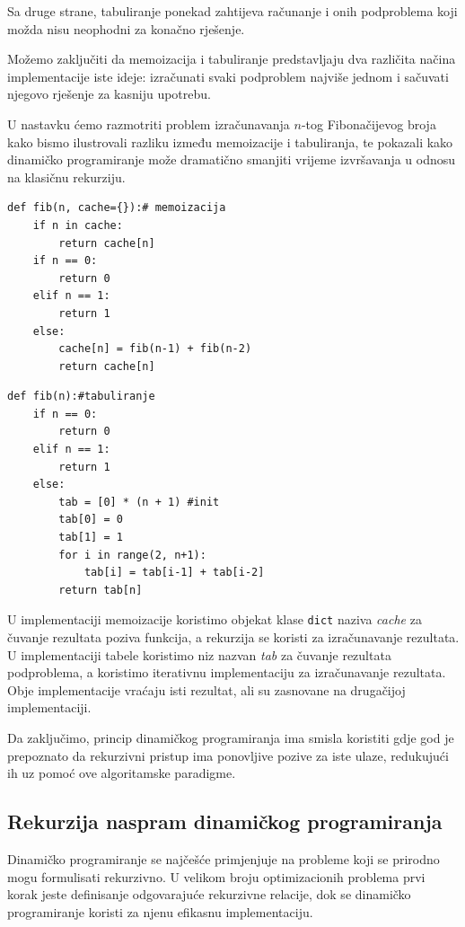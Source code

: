 Sa druge strane, tabuliranje ponekad zahtijeva računanje i onih podproblema koji možda nisu neophodni za konačno rješenje.

\medskip

Možemo zaključiti da memoizacija i tabuliranje predstavljaju dva različita načina implementacije iste ideje: izračunati svaki podproblem najviše jednom i sačuvati njegovo rješenje za kasniju upotrebu.

U nastavku ćemo razmotriti problem izračunavanja $n$-tog Fibonačijevog broja kako bismo ilustrovali razliku između memoizacije i tabuliranja, te pokazali kako dinamičko programiranje može dramatično smanjiti vrijeme izvršavanja u odnosu na klasičnu rekurziju.


\begin{verbatim}
def fib(n, cache={}):# memoizacija
	if n in cache:
		return cache[n]
	if n == 0:
		return 0
	elif n == 1:
		return 1
	else:
		cache[n] = fib(n-1) + fib(n-2)
		return cache[n]
\end{verbatim}

\begin{verbatim}  
def fib(n):#tabuliranje
	if n == 0:
		return 0
	elif n == 1:
		return 1
	else:
		tab = [0] * (n + 1) #init
		tab[0] = 0
		tab[1] = 1
		for i in range(2, n+1):
			tab[i] = tab[i-1] + tab[i-2]
		return tab[n]
\end{verbatim}
U implementaciji memoizacije koristimo objekat klase \texttt{dict} naziva \textit{cache} za čuvanje rezultata poziva funkcija, a rekurzija se koristi za izračunavanje rezultata. U implementaciji tabele koristimo niz nazvan \textit{tab} za čuvanje rezultata podproblema, a koristimo iterativnu impleme\-ntaciju za izračunava\-nje rezultata. Obje implementacije vraćaju isti rezultat, ali su zasnovane na drugačijoj implementaciji. %

Da zaključimo, princip dinamičkog programiranja ima smisla koristiti gdje god je prepoznato da rekurzivni pristup ima ponovljive pozive za iste ulaze, redukujući ih uz pomoć ove algoritamske paradigme.

\subsection{Rekurzija naspram dinamičkog programiranja}

Dinamičko programiranje se najčešće primjenjuje na probleme koji se prirodno mogu formulisati rekurzivno. U velikom broju optimizacionih problema prvi korak jeste definisanje odgovarajuće rekurzivne relacije, dok se dinamičko programiranje koristi za njenu efikasnu implementaciju.

